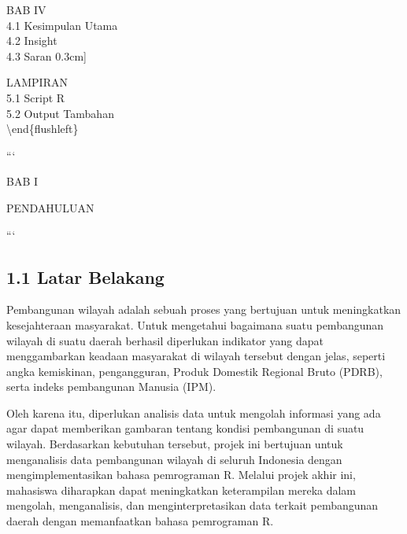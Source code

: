 \documentclass[
  12pt,
]{article}
\begin{document}
BAB IV \\
\hspace*{0.5cm}4.1 Kesimpulan Utama \\
\hspace*{0.5cm}4.2 Insight \\
\hspace*{0.5cm}4.3 Saran \dotfill 4{[}0.3cm{]}

LAMPIRAN \\
\hspace*{0.5cm}5.1 Script R \\
\hspace*{0.5cm}5.2 Output Tambahan \\
\textbackslash end\{flushleft\}

\thispagestyle{empty}

\newpage

\begin{center}
{
\bfseries

```
\vfill

\Large

BAB I

PENDAHULUAN

```

}
\end{center}

\subsection{\texorpdfstring{\normalsize 1.1 \hspace {0,5cm} Latar
Belakang}{1.1  Latar Belakang}}\label{latar-belakang}

\vspace{-0.5cm}

Pembangunan wilayah adalah sebuah proses yang bertujuan untuk
meningkatkan kesejahteraan masyarakat. Untuk mengetahui bagaimana suatu
pembangunan wilayah di suatu daerah berhasil diperlukan indikator yang
dapat menggambarkan keadaan masyarakat di wilayah tersebut dengan jelas,
seperti angka kemiskinan, pengangguran, Produk Domestik Regional Bruto
(PDRB), serta indeks pembangunan Manusia (IPM).

Oleh karena itu, diperlukan analisis data untuk mengolah informasi yang
ada agar dapat memberikan gambaran tentang kondisi pembangunan di suatu
wilayah. Berdasarkan kebutuhan tersebut, projek ini bertujuan untuk
menganalisis data pembangunan wilayah di seluruh Indonesia dengan
mengimplementasikan bahasa pemrograman R. Melalui projek akhir ini,
mahasiswa diharapkan dapat meningkatkan keterampilan mereka dalam
mengolah, menganalisis, dan menginterpretasikan data terkait pembangunan
daerah dengan memanfaatkan bahasa pemrograman R.
\end{document}
